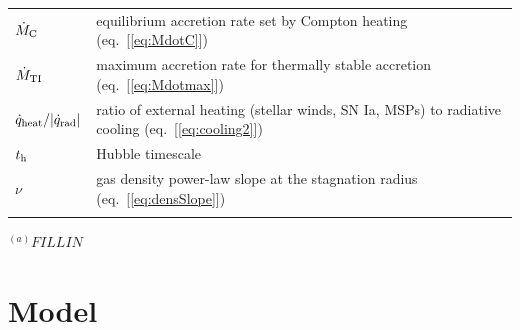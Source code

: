 \documentclass[usenatbib,fleqn]{mn2e}
\begin{document}
\begin{table}
\begin{threeparttable}
\begin{minipage}{18cm}
\begin{tabular}{ll}
$\dot{M}_{\rm C}$ & equilibrium accretion rate set by Compton heating (eq.~[\ref{eq:MdotC}]) \\
$\dot{M}_{\rm TI}$ & maximum accretion rate for thermally stable accretion (eq.~[\ref{eq:Mdotmax}]) \\
$\dot{q}_{\rm heat}/|\dot{q}_{\rm rad}|$ & ratio of external heating (stellar winds, SN Ia, MSPs) to radiative cooling (eq.~[\ref{eq:cooling2}]) \\
$t_{\rm h}$ & Hubble timescale \\
$\nu$ & gas density power-law slope at the stagnation radius
(eq.~[\ref{eq:densSlope}]) \\
\hline
\label{table:definitions}  
\end{tabular}
\begin{tablenotes}
\item{$^{(a)}FILL IN$}
\end{tablenotes}
\end{minipage}
\end{threeparttable}

\end{table}


\section{Model}
\label{sec:model}
\end{document}
